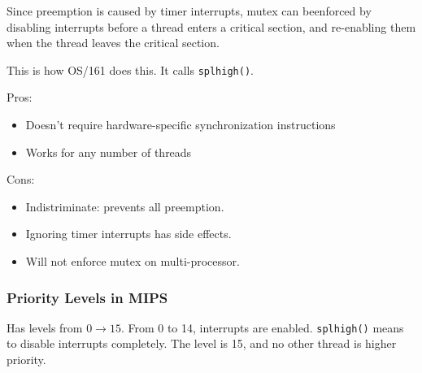 \documentclass[12pt]{article}
\begin{document}
Since preemption is caused by timer interrupts, mutex can beenforced by
disabling interrupts before a thread enters a critical section, and re-enabling
them when the thread leaves the critical section.

This is how OS/161 does this. It calls \texttt{splhigh()}.

Pros:
\begin{itemize}
    \item Doesn't require hardware-specific synchronization instructions
    \item Works for any number of threads
\end{itemize}

Cons:
\begin{itemize}
    \item Indistriminate: prevents all preemption.
    \item Ignoring timer interrupts has side effects.
    \item Will not enforce mutex on multi-processor.
\end{itemize}

\subsubsection{Priority Levels in MIPS}

Has levels from $0 \to 15$. From 0 to 14, interrupts are enabled.
\texttt{splhigh()} means to disable interrupts completely. The level is 15, and
no other thread is higher priority.
\end{document}
